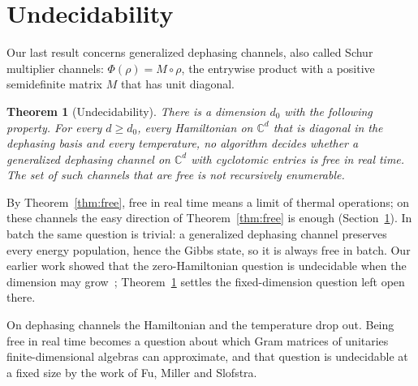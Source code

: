 \documentclass[11pt]{article}
\newtheorem{theorem}{Theorem}
\theoremstyle{definition}
\theoremstyle{remark}
\begin{document}
\section{Undecidability}\label{sec:undecidable}

Our last result concerns generalized dephasing channels, also called Schur multiplier channels: $\Phi(\rho)=M\circ\rho$, the entrywise product with a positive semidefinite matrix $M$ that has unit diagonal.

\begin{theorem}[Undecidability]\label{thm:undecidable}
There is a dimension $d_0$ with the following property. For every $d\ge d_0$, every Hamiltonian on $\mathbb C^d$ that is diagonal in the dephasing basis and every temperature, no algorithm decides whether a generalized dephasing channel on $\mathbb C^d$ with cyclotomic entries is free in real time. The set of such channels that are free is not recursively enumerable.
\end{theorem}

By Theorem~\ref{thm:free}, free in real time means a limit of thermal operations; on these channels the easy direction of Theorem~\ref{thm:free} is enough (Section~\ref{sec:undecidable}). In batch the same question is trivial: a generalized dephasing channel preserves every energy population, hence the Gibbs state, so it is always free in batch. Our earlier work showed that the zero-Hamiltonian question is undecidable when the dimension may grow~\cite{Flagship}; Theorem~\ref{thm:undecidable} settles the fixed-dimension question left open there.

On dephasing channels the Hamiltonian and the temperature drop out. Being free in real time becomes a question about which Gram matrices of unitaries finite-dimensional algebras can approximate, and that question is undecidable at a fixed size by the work of Fu, Miller and Slofstra.
\end{document}

